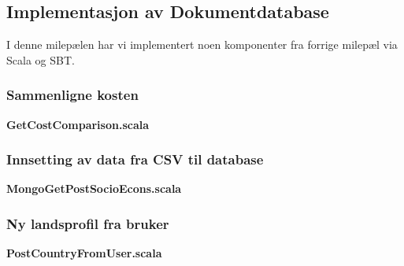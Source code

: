 \subsection{Implementasjon av Dokumentdatabase}
I denne milepælen har vi implementert noen komponenter fra forrige milepæl via Scala og SBT.

\subsubsection{Sammenligne kosten}
\textbf{GetCostComparison.scala}\\

\subsubsection{Innsetting av data fra CSV til database}
\textbf{MongoGetPostSocioEcons.scala}\\

\subsubsection{Ny landsprofil fra bruker}
\textbf{PostCountryFromUser.scala}\\

